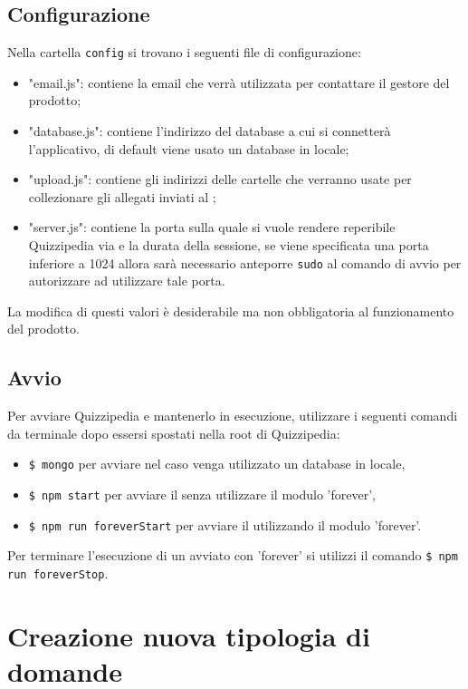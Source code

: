 \documentclass[a4paper, titlepage]{article}
\begin{document}
	\subsection{Configurazione}
	Nella cartella \texttt{config} si trovano i seguenti file di configurazione:
	\begin{itemize}
		\item "email.js": contiene la email che verrà utilizzata per contattare il gestore del prodotto;
		\item "database.js": contiene l'indirizzo del database a cui si connetterà l'applicativo, di default viene usato un database in locale;
		\item "upload.js": contiene gli indirizzi delle cartelle che verranno usate per collezionare gli allegati inviati al ;
		\item "server.js": contiene la porta sulla quale si vuole rendere reperibile Quizzipedia via  e la durata della sessione,
		se viene specificata una porta inferiore a 1024 allora sarà necessario anteporre \texttt{sudo} al comando di avvio per autorizzare  ad utilizzare tale porta.
	\end{itemize}
	La modifica di questi valori è desiderabile ma non obbligatoria al funzionamento del prodotto.
	
	\subsection{Avvio}
	
	Per avviare Quizzipedia e mantenerlo in esecuzione, utilizzare i seguenti comandi da terminale dopo essersi spostati nella root di Quizzipedia:
	\begin{itemize}
		\item \texttt{\$ mongo} per avviare  nel caso venga utilizzato un database in locale,
		\item \texttt{\$ npm start} per avviare il  senza utilizzare il modulo 'forever',
		\item \texttt{\$ npm run foreverStart} per avviare il  utilizzando il modulo 'forever'.
	\end{itemize}
	Per terminare l'esecuzione di un  avviato con 'forever' si utilizzi il comando \texttt{\$ npm run foreverStop}.
	
	\newpage
	
	\section{Creazione nuova tipologia di domande}
	
\end{document}
